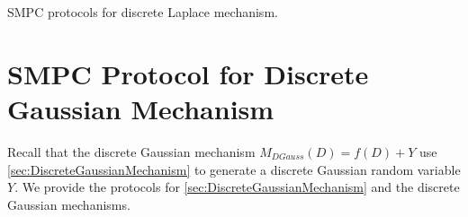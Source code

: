       \begin{protocol}[tbh!]
            \centering
            \caption{SMPC protocols for discrete Laplace mechanism.}
            \label{prot:DLapMechanism}
      \end{protocol}
      \FloatBarrier



      \section{SMPC Protocol for Discrete Gaussian Mechanism}
      \label{MPCProtocolforDiscreteGaussianMechanism}
      Recall that the discrete Gaussian mechanism $M_{DGauss}\left(D\right)=f\left(D\right)+Y$ use \autoref{sec:DiscreteGaussianMechanism} to generate a discrete Gaussian random variable $Y$. 
      We provide the \smpc protocols for \autoref{sec:DiscreteGaussianMechanism} and the discrete Gaussian mechanisms.



